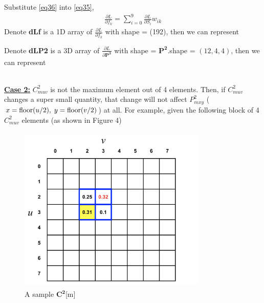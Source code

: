 \documentclass[a4paper,12pt]{article}
\newcommand*\myyellowbox[1]{%
\colorbox{myyellow}{\hspace{1em}#1\hspace{1em}}}
\begin{document}
Substitute \eqref{eq36} into \eqref{eq35},
\begin{equation}
\begin{aligned}
\frac{\partial{L}}{\partial{f_k}} = \sum\limits_{i = 0}^{9}\frac{\partial{L}}{\partial{S_i}}w_{ik} \label{eq37}
\end{aligned}
\end{equation}
Denote \textbf{dLf} is a 1D array of $\frac{\partial{L}}{\partial{f_k}}$ with shape = (192), then we can represent
Denote \textbf{dLP2} is a 3D array of $\frac{\partial{L}}{\partial{\boldsymbol{P^2}}}$ with shape = $\boldsymbol{P^2}$.shape = $(12, 4, 4)$, then we can represent
\\[0.5cm]
\underline{\textbf{Case 2:}} $C^2_{muv}$ is not the maximum element out of 4 elements. Then, if $C^2_{muv}$ changes a super small quantity, that change will not affect $P^2_{mxy}$ ($x = \text{floor}(u / 2),\thickspace y = \text{floor}(v / 2)$) at all. For example, given the following block of 4 $C^2_{muv}$ elements (as shown in Figure 4)\\
\begin{figure}[h]
  \begin{center}
    \includegraphics[width=9cm, height=8cm]{C2.png}
    \caption{A sample $\boldsymbol{C^2}$[m]}
  \end{center}
  \label{fig:maxpool}
\end{figure}\\
\end{document}
